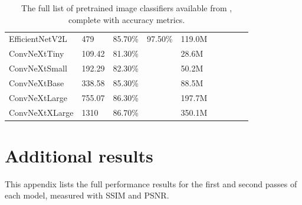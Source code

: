 \begin{appendices}
\begin{table}[ht]
{\begin{tabular}{llllllll}
            EfficientNetV2L & 479 & 85.70\% & 97.50\% & 119.0M & ~ & ~ & ~ \\ 
            ConvNeXtTiny & 109.42 & 81.30\% & ~ & 28.6M & ~ & ~ & ~ \\ 
            ConvNeXtSmall & 192.29 & 82.30\% & ~ & 50.2M & ~ & ~ & ~ \\ 
            ConvNeXtBase & 338.58 & 85.30\% & ~ & 88.5M & ~ & ~ & ~ \\ 
            ConvNeXtLarge & 755.07 & 86.30\% & ~ & 197.7M & ~ & ~ & ~ \\ 
            ConvNeXtXLarge & 1310 & 86.70\% & ~ & 350.1M & ~ & ~ & ~ \\
            \bottomrule
        \end{tabular}
    }
    \caption{The full list of pretrained image classifiers available from , complete with accuracy metrics.}
\end{table}

\chapter{Additional results}
This appendix lists the full performance results for the first and second passes of each model, measured with SSIM and PSNR.\@

\end{appendices}
